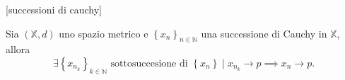 [successioni di cauchy]

\begin{proposition} \label{pro:con-suc-mad}
    Sia $\left(\mathbb{X}, d\right)$ uno spazio metrico e $\left\{x_n\right\}_{n\in\mathbb{N}}$
    una successione di Cauchy in $\mathbb{X}$, allora
    \[
        \exists\left\{x_{n_k}\right\}_{k\in\mathbb{N}}\text{ sottosuccesione di }\left\{x_n\right\}
        \mid x_{n_k} \rightarrow p \implies x_n \rightarrow p.
    \]
\end{proposition}

